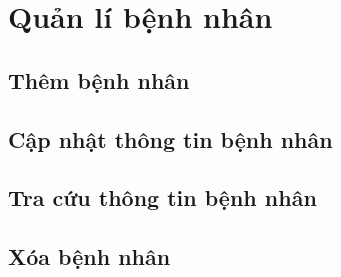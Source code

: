 \section{Quản lí bệnh nhân}

\subsection{Thêm bệnh nhân}

\subsection{Cập nhật thông tin bệnh nhân}

\subsection{Tra cứu thông tin bệnh nhân}

\subsection{Xóa bệnh nhân}

